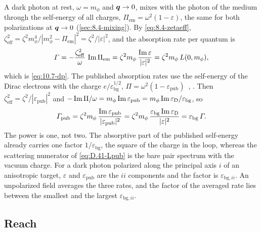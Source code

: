 A dark photon at rest, $\omega = m_\phi$ and $\bm{q} \to 0$, mixes with the photon of the medium through the self-energy of all charges, $\Pi_{\mathrm{em}} = \omega^2(1 - \varepsilon)$, the same for both polarizations at $\bm{q} \to 0$ (\cref{sec:8.4-mixing}). By \cref{eq:8.4-zetaeff}, $\zeta_{\mathrm{eff}}^2 = \zeta^2m_\phi^4/|m_\phi^2 - \Pi_{\mathrm{em}}|^2 = \zeta^2/|\varepsilon|^2$, and the absorption rate per quantum is
\begin{equation}
  \varGamma = -\frac{\zeta_{\mathrm{eff}}^2}{\omega}\,\operatorname{Im}\Pi_{\mathrm{em}} = \zeta^2m_\phi\,\frac{\operatorname{Im}\varepsilon}{|\varepsilon|^2} = \zeta^2m_\phi\,L(0,m_\phi) ,
  \label{eq:D.41-abs}
\end{equation}
which is \cref{eq:10.7-dp}. The published absorption rates use the self-energy of the Dirac electrons with the charge $e/\varepsilon_{\mathrm{bg}}^{1/2}$, $\Pi = \omega^2(1 - \varepsilon_{\mathrm{pub}})$~\cite[Eqs.~(4.4), (4.5)]{hochberg2018detection}, \cite[Eqs.~(2.25)--(2.27)]{geilhufe2020dirac}. Then $\zeta_{\mathrm{eff}}^2 = \zeta^2/|\varepsilon_{\mathrm{pub}}|^2$ and $-\operatorname{Im}\Pi/\omega = m_\phi\operatorname{Im}\varepsilon_{\mathrm{pub}} = m_\phi\operatorname{Im}\varepsilon_{\mathrm{D}}/\varepsilon_{\mathrm{bg}}$, so
\begin{equation}
  \varGamma_{\mathrm{pub}} = \zeta^2m_\phi\,\frac{\operatorname{Im}\varepsilon_{\mathrm{pub}}}{|\varepsilon_{\mathrm{pub}}|^2} = \zeta^2m_\phi\,\frac{\varepsilon_{\mathrm{bg}}\operatorname{Im}\varepsilon_{\mathrm{D}}}{|\varepsilon|^2} = \varepsilon_{\mathrm{bg}}\,\varGamma .
  \label{eq:D.41-abspub}
\end{equation}
The power is one, not two. The absorptive part of the published self-energy already carries one factor $1/\varepsilon_{\mathrm{bg}}$, the square of the charge in the loop, whereas the scattering numerator of \cref{eq:D.41-Lpub} is the bare pair spectrum with the vacuum charge. For a dark photon polarized along the principal axis $i$ of an anisotropic target, $\varepsilon$ and $\varepsilon_{\mathrm{pub}}$ are the $ii$ components and the factor is $\varepsilon_{\mathrm{bg},ii}$. An unpolarized field averages the three rates, and the factor of the averaged rate lies between the smallest and the largest $\varepsilon_{\mathrm{bg},ii}$.

\subsection*{Reach}

